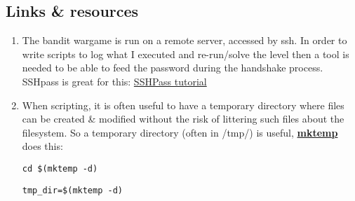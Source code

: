 \documentclass[a4paper]{article}
\begin{document}
\subsection*{Links \& resources}
\begin{enumerate}
\item The bandit wargame is run on a remote server, accessed by ssh. In order to write scripts to log what I executed and re-run/solve the level then a tool is needed to be able to feed the password during the handshake process. SSHpass is great for this: \href{https://askubuntu.com/questions/224181/how-do-i-include-a-password-with-ssh-command-want-to-make-shell-script}{SSHPass tutorial} 

\item When scripting, it is often useful to have a temporary directory where files can be created \& modified without the risk of littering such files about the filesystem. So a temporary directory (often in /tmp/) is useful, \href{https://code-maven.com/create-temporary-directory-on-linux-using-bash}{\textbf{mktemp}} does this:
	\begin{lstlisting}[title=move to the new temporary directory]
	cd $(mktemp -d)
	\end{lstlisting}
	\begin{lstlisting}[title=store the new temporary directory path]
	tmp_dir=$(mktemp -d)
	\end{lstlisting}
\end{enumerate}
\end{document}
